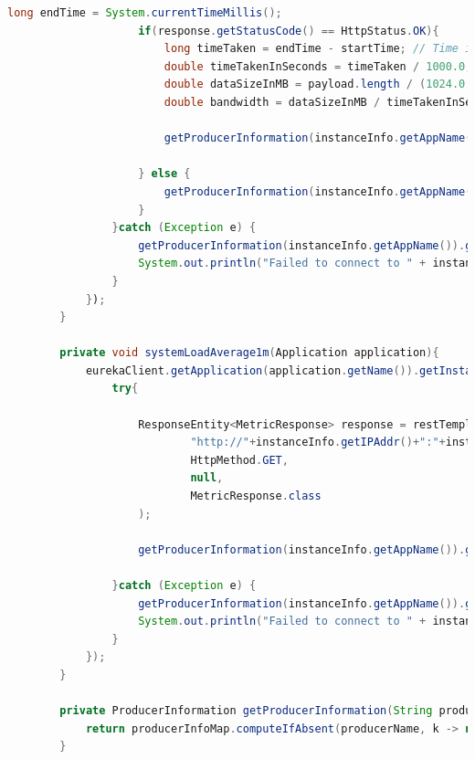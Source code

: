 \begin{lstlisting}[language=Java, caption=Kod usługi ProducerInfoService,label=ProducerInfoServiceCode]
                    long endTime = System.currentTimeMillis();
                    if(response.getStatusCode() == HttpStatus.OK){
                        long timeTaken = endTime - startTime; // Time in milliseconds
                        double timeTakenInSeconds = timeTaken / 1000.0;
                        double dataSizeInMB = payload.length / (1024.0 * 1024.0);
                        double bandwidth = dataSizeInMB / timeTakenInSeconds; // MB/s
    
                        getProducerInformation(instanceInfo.getAppName()).getMeasurementBufferConnectionSpeed().addMeasurement(bandwidth);
    
                    } else {
                        getProducerInformation(instanceInfo.getAppName()).getMeasurementBufferConnectionSpeed().addMeasurement(Double.MAX_VALUE);
                    }
                }catch (Exception e) {
                    getProducerInformation(instanceInfo.getAppName()).getMeasurementBufferConnectionSpeed().addMeasurement(Double.MAX_VALUE);
                    System.out.println("Failed to connect to " + instanceInfo.getIPAddr() + ":" + instanceInfo.getPort() + "-> "+e.getMessage());
                }
            });
        }
    
        private void systemLoadAverage1m(Application application){
            eurekaClient.getApplication(application.getName()).getInstances().forEach(instanceInfo -> {
                try{
    
                    ResponseEntity<MetricResponse> response = restTemplate.exchange(
                            "http://"+instanceInfo.getIPAddr()+":"+instanceInfo.getPort()+"/actuator/metrics/system.load.average.1m",
                            HttpMethod.GET,
                            null,
                            MetricResponse.class
                    );
    
                    getProducerInformation(instanceInfo.getAppName()).getMeasurementBufferSystemLoadAverage1m().addMeasurement(response.getBody().getMeasurements().get(0).getValue());
    
                }catch (Exception e) {
                    getProducerInformation(instanceInfo.getAppName()).getMeasurementBufferSystemLoadAverage1m().addMeasurement(Double.MAX_VALUE);
                    System.out.println("Failed to connect to " + instanceInfo.getIPAddr() + ":" + instanceInfo.getPort() + "-> "+e.getMessage());
                }
            });
        }
    
        private ProducerInformation getProducerInformation(String producerName) {
            return producerInfoMap.computeIfAbsent(producerName, k -> new ProducerInformation());
        }
    

\end{lstlisting}
